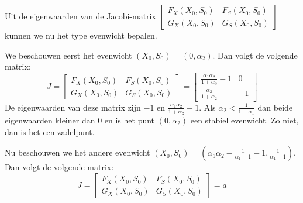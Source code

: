 Uit de eigenwaarden van de Jacobi-matrix $\left[ \begin{array}{cc}
F_X(X_0,S_0) & F_S(X_0,S_0) \\
G_X(X_0,S_0) & G_S(X_0,S_0) \end{array} \right]$ kunnen we nu het type evenwicht bepalen.

We beschouwen eerst het evenwicht $(X_0, S_0) = (0, \alpha_2)$. Dan volgt de volgende matrix:
\[J = \left[ \begin{array}{cc}
F_X(X_0,S_0) & F_S(X_0,S_0) \\
G_X(X_0,S_0) & G_S(X_0,S_0) \end{array} \right] =
\left[ \begin{array}{cc}
\frac{\alpha_1\alpha_2}{1+\alpha_2}-1 & 0 \\
\frac{\alpha_2}{1+\alpha_2} & -1 \end{array} \right]\]
De eigenwaarden van deze matrix zijn $-1$ en $\frac{\alpha_1\alpha_2}{1+\alpha_2}-1$. Als $\alpha_2 < \frac{1}{1-\alpha_1}$ dan beide eigenwaarden kleiner dan 0 en is het punt $(0, \alpha_2)$ een stabiel evenwicht. Zo niet, dan is het een zadelpunt.

Nu beschouwen we het andere evenwicht $(X_0, S_0) = (\alpha_1\alpha_2-\frac{1}{\alpha_1-1}-1,\frac{1}{\alpha_1-1})$. Dan volgt de volgende matrix:
\[J = \left[ \begin{array}{cc}
F_X(X_0,S_0) & F_S(X_0,S_0) \\
G_X(X_0,S_0) & G_S(X_0,S_0) \end{array} \right] =
a
\]









